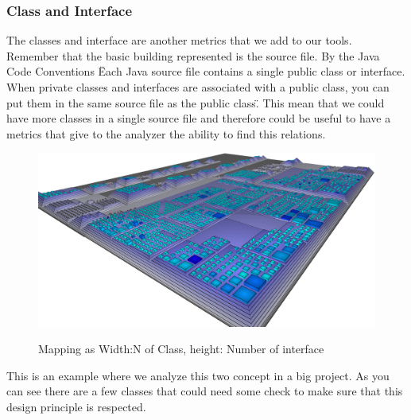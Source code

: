 \documentclass[]{usiinfbachelorproject}
\begin{document}
\subsubsection{Class and Interface}

The classes and  interface are another metrics that we add to our tools. Remember that the basic building represented is the source file.  By the Java Code Conventions \cite{oracle}  \" Each Java source file contains a single public class or interface. When private classes and
interfaces are associated with a public class, you can put them in the same source file as the public class\". This mean that we could have more classes in a single source file and therefore could be useful to have a metrics that give to the analyzer the ability to find this relations.

\begin{figure}[h]
\centering

		\includegraphics[width=.60\textwidth]{images/ClassesAndInterfaces}
	\label{fig:classInterface}
	\caption[Classes and Interfaces Mapping]{Mapping as Width:N of Class, height: Number of interface}
	
\end{figure}

This is an example where we analyze this two concept in a big project.
As you can see there are a few classes that could need some check to make sure that this design  principle is respected.
\end{document}
